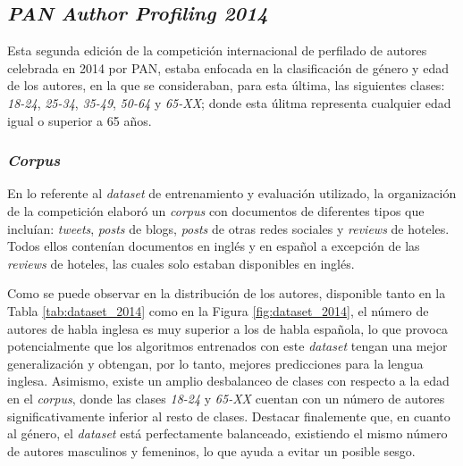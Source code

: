 \subsection{\textit{PAN Author Profiling 2014}}

Esta segunda edición de la competición internacional de perfilado de autores celebrada en 2014 por PAN, estaba enfocada en la clasificación de género y edad de los autores, en la que se consideraban, para esta última, las siguientes
clases: \textit{18-24}, \textit{25-34}, \textit{35-49}, \textit{50-64} y \textit{65-XX}; donde esta úlitma representa cualquier edad igual o superior a 65 años.

\subsubsection{\textit{Corpus}}

En lo referente al \textit{dataset} de entrenamiento y evaluación utilizado, la organización de la
competición elaboró un \textit{corpus} con documentos de diferentes tipos que incluían: \textit{tweets}, \textit{posts} de blogs, \textit{posts} de otras redes sociales y \textit{reviews} de hoteles.
Todos ellos contenían documentos en inglés y en español a excepción de las \textit{reviews} de hoteles, las cuales solo estaban disponibles en inglés.

\bigskip
Como se puede observar en la distribución de los autores, disponible tanto en la Tabla \ref{tab:dataset_2014} como en la Figura \ref{fig:dataset_2014}, el número de autores de habla inglesa
es muy superior a los de habla española, lo que provoca potencialmente que los algoritmos entrenados con este \textit{dataset} tengan una mejor generalización y obtengan, por lo tanto,
mejores predicciones para la lengua inglesa. Asimismo, existe un amplio desbalanceo de clases con respecto a la edad en el \textit{corpus},
donde las clases \textit{18-24} y \textit{65-XX} cuentan con un número de autores significativamente inferior al resto de clases. Destacar finalemente que,
en cuanto al género, el \textit{dataset} está perfectamente balanceado, existiendo el mismo número de autores masculinos y femeninos, lo que
ayuda a evitar un posible sesgo.

